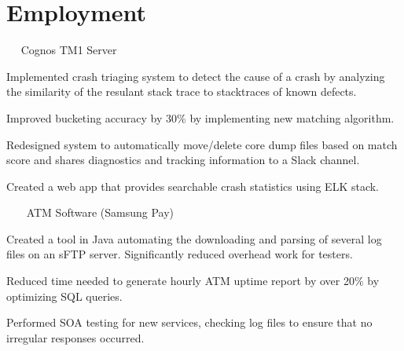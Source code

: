 \documentclass[]{deedy-resume-openfont}
\begin{document}
\hfill
\begin{minipage}[t]{0.66\textwidth} 


\section{Employment}

~~ Cognos TM1 Server
\vspace{\topsep} %
\begin{tightemize}
\item Implemented crash triaging system to detect the cause of a crash by analyzing the similarity of the resulant stack trace to stacktraces of known defects.
\item Improved bucketing accuracy by 30\% by implementing new matching algorithm.
\item Redesigned system to automatically move/delete core dump files based on match score and shares diagnostics and tracking information to a Slack channel.
\item Created a web app that provides searchable crash statistics using ELK stack.
\end{tightemize}
\sectionsep

~~~ ATM Software (Samsung Pay) 
\begin{tightemize}
\item Created a tool in Java automating the downloading and parsing of several log files on an sFTP server. Significantly reduced overhead work for testers. %
\item Reduced time needed to generate hourly ATM uptime report by over 20\% by optimizing SQL queries.   
\item Performed SOA testing for new services, checking log files to ensure that no irregular responses occurred.
\end{tightemize}
\sectionsep


\end{minipage}
\end{document}

